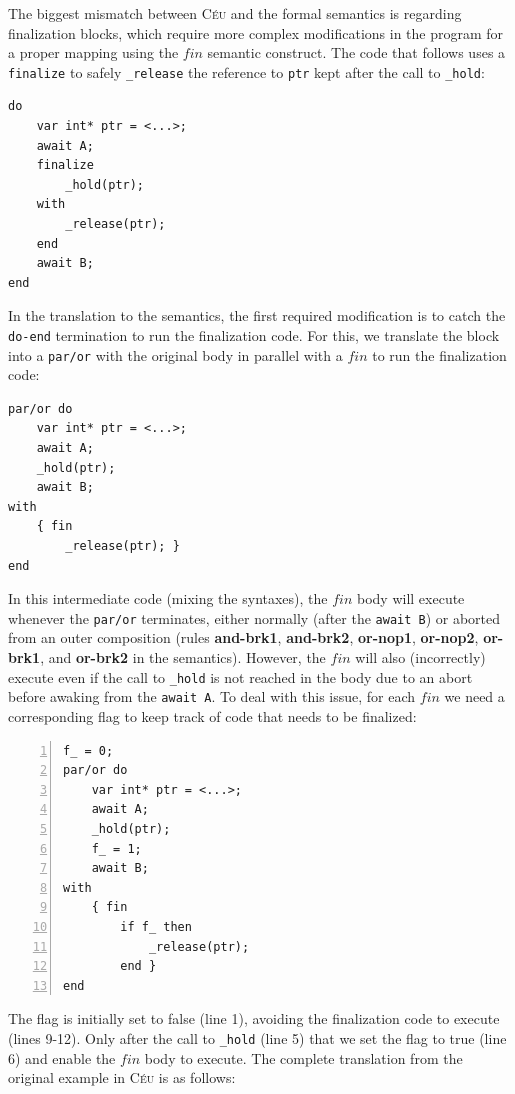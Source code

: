 \documentclass{sigplanconf}
\newcommand{\CEU}{\textsc{C\'{e}u}\xspace}
\newcommand{\code}[1] {{\small{\texttt{#1}}}}
\newcommand{\1}{\;}
\newcommand{\2}{\;\;}
\newcommand{\3}{\;\;\;}
\newcommand{\5}{\;\;\;\;\;}
\begin{document}
The biggest mismatch between \CEU and the formal semantics is regarding 
finalization blocks, which require more complex modifications in the program
for a proper mapping using the $fin$ semantic construct.
The code that follows uses a \code{finalize} to safely \code{\_release} the 
reference to \code{ptr} kept after the call to \code{\_hold}:

\begin{lstlisting}
do
    var int* ptr = <...>;
    await A;
    finalize
        _hold(ptr);
    with
        _release(ptr);
    end
    await B;
end
\end{lstlisting}

In the translation to the semantics, the first required modification is to 
catch the \code{do-end} termination to run the finalization code.
For this, we translate the block into a \code{par/or} with the original body in 
parallel with a $fin$ to run the finalization code:

\begin{lstlisting}
par/or do
    var int* ptr = <...>;
    await A;
    _hold(ptr);
    await B;
with
    { fin
        _release(ptr); }
end
\end{lstlisting}

In this intermediate code (mixing the syntaxes), the $fin$ body will execute
whenever the \code{par/or} terminates, either normally (after the \code{await 
B}) or aborted from an outer composition (rules \textbf{and-brk1}, 
\textbf{and-brk2}, \textbf{or-nop1}, \textbf{or-nop2}, \textbf{or-brk1}, and 
\textbf{or-brk2} in the semantics).
%
%
However, the $fin$ will also (incorrectly) execute even if the call to 
\code{\_hold} is not reached in the body due to an abort before awaking from 
the \code{await A}.
%
To deal with this issue, for each $fin$ we need a corresponding flag to keep 
track of code that needs to be finalized:

\begin{lstlisting}[numbers=left,xleftmargin=2em]
f_ = 0;
par/or do
    var int* ptr = <...>;
    await A;
    _hold(ptr);
    f_ = 1;
    await B;
with
    { fin
        if f_ then
            _release(ptr);
        end }
end
\end{lstlisting}

The flag is initially set to false (line 1), avoiding the finalization code to 
execute (lines 9-12).
Only after the call to \code{\_hold} (line 5) that we set the flag to true 
(line 6) and enable the $fin$ body to execute.
%
The complete translation from the original example in \CEU is as follows:
\end{document}
